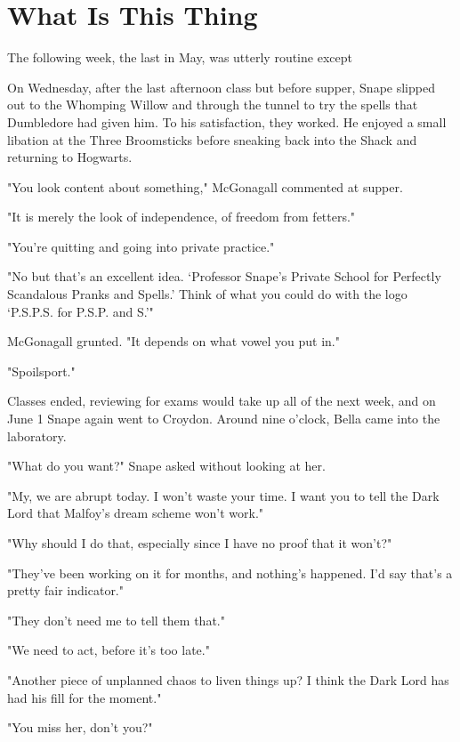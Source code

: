 
\chapter{What Is This Thing\texorpdfstring{\el}{ . . .}}

The following week, the last in May, was utterly routine except{\el}

On Wednesday, after the last afternoon class but before supper, Snape slipped out to the Whomping Willow and through the tunnel to try the spells that Dumbledore had given him. To his satisfaction, they worked. He enjoyed a small libation at the Three Broomsticks before sneaking back into the Shack and returning to Hogwarts.

"You look content about something," McGonagall commented at supper.

"It is merely the look of independence, of freedom from fetters."

"You're quitting and going into private practice."

"No{\el} but that's an excellent idea. `Professor Snape's Private School for Perfectly Scandalous Pranks and Spells.' Think of what you could do with the logo `P.S.P.S. for P.S.P. and S.'"

McGonagall grunted. "It depends on what vowel you put in."

"Spoilsport."

Classes ended, reviewing for exams would take up all of the next week, and on June 1 Snape again went to Croydon. Around nine o'clock, Bella came into the laboratory.

"What do you want?" Snape asked without looking at her.

"My, we are abrupt today. I won't waste your time. I want you to tell the Dark Lord that Malfoy's dream scheme won't work."

"Why should I do that, especially since I have no proof that it won't?"

"They've been working on it for months, and nothing's happened. I'd say that's a pretty fair indicator."

"They don't need me to tell them that."

"We need to act, before it's too late."

"Another piece of unplanned chaos to liven things up? I think the Dark Lord has had his fill for the moment."

"You miss her, don't you?"

